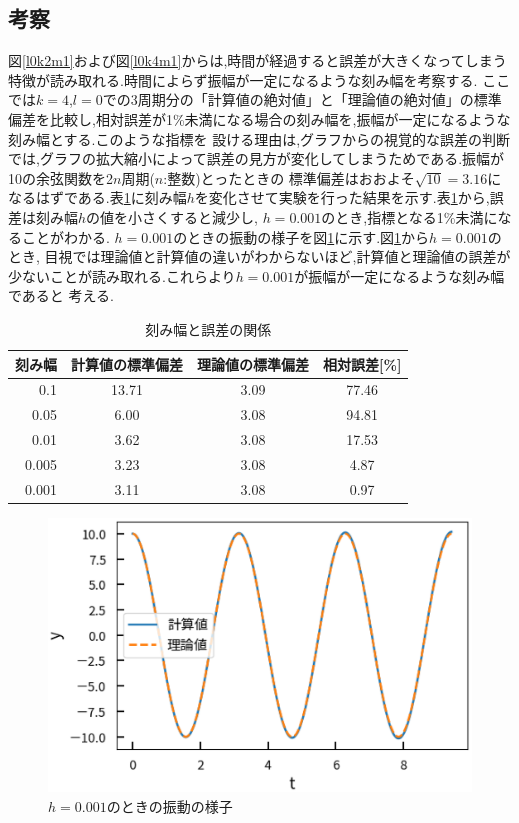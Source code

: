 \documentclass[a4j]{jarticle}
\begin{document}
      \subsection{考察}
      図\ref{l0k2m1}および図\ref{l0k4m1}からは,時間が経過すると誤差が大きくなってしまう特徴が読み取れる.時間によらず振幅が一定になるような刻み幅を考察する.
      ここでは$k=4$,$l=0$での3周期分の「計算値の絶対値」と「理論値の絶対値」の標準偏差を比較し,相対誤差が1\%未満になる場合の刻み幅を,振幅が一定になるような刻み幅とする.このような指標を
      設ける理由は,グラフからの視覚的な誤差の判断では,グラフの拡大縮小によって誤差の見方が変化してしまうためである.振幅が10の余弦関数を2$n$周期($n$:整数)とったときの
      標準偏差はおおよそ$\sqrt{10}=3.16$になるはずである.表\ref{h7}に刻み幅$h$を変化させて実験を行った結果を示す.表\ref{h7}から,誤差は刻み幅$h$の値を小さくすると減少し,
      $h=0.001$のとき,指標となる1\%未満になることがわかる. $h=0.001$のときの振動の様子を図\ref{h0001}に示す.図\ref{h0001}から$h=0.001$のとき,
      目視では理論値と計算値の違いがわからないほど,計算値と理論値の誤差が少ないことが読み取れる.これらより$h=0.001$が振幅が一定になるような刻み幅であると
      考える.

      \begin{table}[H]
      \caption{刻み幅と誤差の関係}
      \label{h7}
      \begin{center}
      \begin{tabular}{r|c|c|c}\hline
        刻み幅 & 計算値の標準偏差 & 理論値の標準偏差 & 相対誤差[\%] \\ \hline \hline 
        0.1 & 13.71 & 3.09 & 77.46 \\
        0.05 & 6.00 & 3.08 & 94.81 \\
        0.01 & 3.62 & 3.08 & 17.53 \\
        0.005 & 3.23 & 3.08 & 4.87 \\
        0.001 & 3.11 & 3.08 & 0.97\\ \hline
      \end{tabular}
      \end{center}
      \end{table}

      \begin{figure}[H]
      \centering
      \includegraphics[scale=0.6]{h0001.eps}
      \caption{$h=0.001$のときの振動の様子}
      \label{h0001}
      \end{figure}
\end{document}
